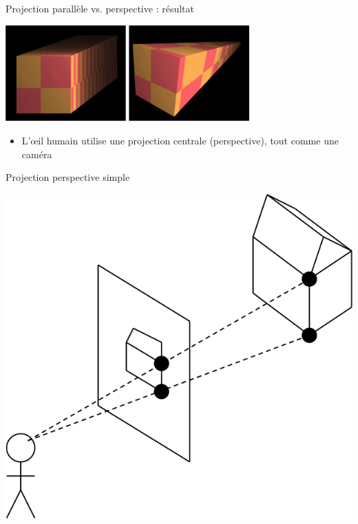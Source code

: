\begin{frame}{Projection parallèle vs. perspective : résultat}
\begin{center}
\includegraphics[height=3.7cm]{figs/projparr.png} \hspace{1cm}
\includegraphics[height=3.7cm]{figs/projpersp1.png} \\

\end{center}
\begin{itemize}
\item L'\oe il humain utilise une projection centrale (perspective), tout comme une caméra
\end{itemize}
\end{frame}

\begin{frame}{Projection perspective simple}
\begin{center}
\includegraphics[height=.6\textheight]{figs/persp1.png}
\end{center}
\end{frame}

